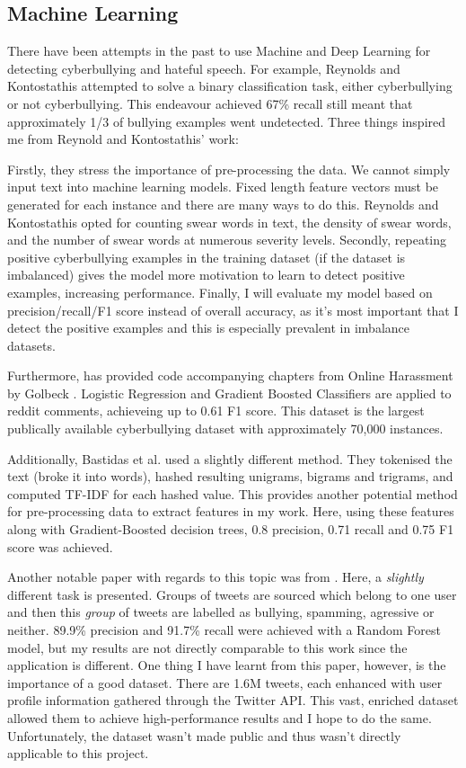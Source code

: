 \documentclass[12pt,a4paper]{article}
\begin{document}
\subsection{Machine Learning}
There have been attempts in the past to use Machine and Deep Learning for detecting cyberbullying and hateful speech. For example, Reynolds and Kontostathis \citeyear[p.4]{Reynolds} attempted to solve a binary classification task, either cyberbullying or not cyberbullying. This endeavour achieved 67\% recall still meant that approximately 1/3 of bullying examples went undetected. Three things inspired me from Reynold and Kontostathis' \citeyear{Reynolds} work:

Firstly, they stress the importance of pre-processing the data. We cannot simply input text into machine learning models. Fixed length feature vectors must be generated for each instance and there are many ways to do this. Reynolds and Kontostathis opted for counting swear words in text, the density of swear words, and the number of swear words at numerous severity levels.  Secondly, repeating positive cyberbullying examples in the training dataset (if the dataset is imbalanced) gives the model more motivation to learn to detect positive examples, increasing performance. Finally, I will evaluate my model based on precision/recall/F1 score instead of overall accuracy, as it's most important that I detect the positive examples and this is especially prevalent in imbalance datasets.

Furthermore, \cite{Dixon} has provided code accompanying chapters from Online Harassment by Golbeck \citeyear{Golbeck}. Logistic Regression and Gradient Boosted Classifiers are applied to reddit comments, achieveing up to 0.61 F1 score. This dataset is the largest publically available cyberbullying dataset with approximately 70,000 instances. 

Additionally, Bastidas et al. \citeyear[p.2/3]{Hack} used a slightly different method. They tokenised the text (broke it into words), hashed resulting unigrams, bigrams and trigrams, and computed TF-IDF for each hashed value. This provides another potential method for pre-processing data to extract features in my work. Here, using these features along with Gradient-Boosted decision trees, 0.8 precision, 0.71 recall and 0.75 F1 score was achieved. 

Another notable paper with regards to this topic was from \cite{Birds}. Here, a \textit{slightly} different task is presented. Groups of tweets are sourced which belong to one user and then this \textit{group} of tweets are labelled as bullying, spamming, agressive or neither. 89.9\% precision and 91.7\% recall were achieved with a Random Forest model, but my results are not directly comparable to this work since the application is different. One thing I have learnt from this paper, however, is the importance of a good dataset. There are 1.6M tweets, each enhanced with user profile information gathered through the Twitter API. This vast, enriched dataset allowed them to achieve high-performance results and I hope to do the same. Unfortunately, the dataset wasn't made public and thus wasn't directly applicable to this project.
\end{document}
